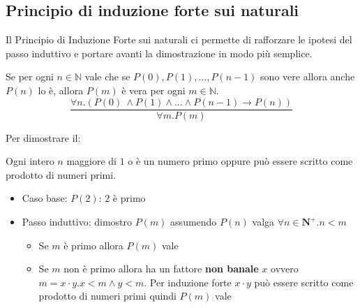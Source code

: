 \subsection{Principio di induzione forte sui naturali}
Il Principio di Induzione Forte sui naturali ci permette di rafforzare le ipotesi del passo induttivo e portare avanti la dimostrazione in modo più semplice.
\begin{definition}
    Se per ogni $n \in \mathbb{N}$ vale che se $P(0), P(1),\ldots, P(n-1)$ sono vere allora anche $P(n)$ lo è, allora $P(m)$ è vera per ogni $m \in \mathbb{N}$.
    \begin{equation}
        \frac{\forall n . (P(0) \: \land P(1) \land ... \land P(n-1) \rightarrow P(n))}{\forall m . P(m)}
    \end{equation}
\end{definition}
\begin{example}
	Per dimostrare il:
	\begin{definition}
		Ogni intero $n$ maggiore di $1$ o è un numero primo oppure può essere scritto come prodotto di numeri primi.
	\end{definition}
	\begin{itemize}
		\item Caso base: $P(2)$: $2$ è primo
		\item Passo induttivo: dimostro $P(m)$ assumendo $P(n)$ valga $\forall n \in \mathbf{N}^+ . n<m$
		\begin{itemize}
			\item Se $m$ è primo allora $P(m)$ vale
			\item Se $m$ non è primo allora ha un fattore \textbf{non banale} $x$ ovvero $m = x \cdot y . x < m \wedge y<m$. Per induzione forte $x \cdot y$ può essere scritto come prodotto di numeri primi quindi $P(m)$ vale
		\end{itemize}
	\end{itemize}
\end{example}